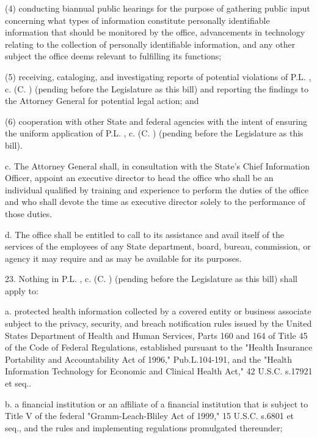      (4)   conducting biannual public hearings for the purpose of gathering public input concerning what types of information constitute personally identifiable information that should be monitored by the office, advancements in technology relating to the collection of personally identifiable information, and any other subject the office deems relevant to fulfilling its functions;

     (5)   receiving, cataloging, and investigating reports of potential violations of P.L.    , c.    (C.      ) (pending before the Legislature as this bill) and reporting the findings to the Attorney General for potential legal action; and

     (6)   cooperation with other State and federal agencies with the intent of ensuring the uniform application of P.L.    , c.    (C.      ) (pending before the Legislature as this bill).

     c.     The Attorney General shall, in consultation with the State's Chief Information Officer, appoint an executive director to head the office who shall be an individual qualified by training and experience to perform the duties of the office and who shall devote the time as executive director solely to the performance of those duties.

     d.    The office shall be entitled to call to its assistance and avail itself of the services of the employees of any State department, board, bureau, commission, or agency it may require and as may be available for its purposes.

 

     23.  Nothing in P.L.    , c.    (C.      ) (pending before the Legislature as this bill) shall apply to:

     a.     protected health information collected by a covered entity or business associate subject to the privacy, security, and breach notification rules issued by the United States Department of Health and Human Services, Parts 160 and 164 of Title 45 of the Code of Federal Regulations, established pursuant to the "Health Insurance Portability and Accountability Act of 1996," Pub.L.104-191, and the "Health Information Technology for Economic and Clinical Health Act," 42 U.S.C. s.17921 et seq..

     b.    a financial institution or an affiliate of a financial institution that is subject to Title V of the federal "Gramm-Leach-Bliley Act of 1999," 15 U.S.C. s.6801 et seq., and the rules and implementing regulations promulgated thereunder; 

